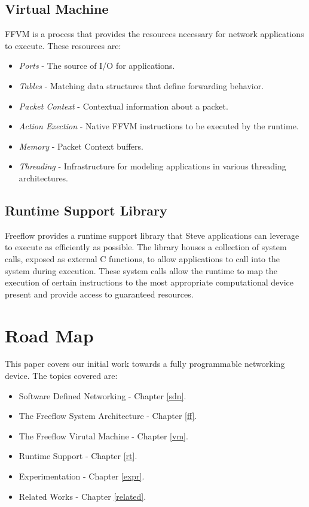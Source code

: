 \subsection{Virtual Machine}
FFVM is a process that provides the resources necessary for network
applications to execute. These resources are:

\begin{itemize}
\item \emph{Ports} - The source of I/O for applications.
\item \emph{Tables} - Matching data structures that define forwarding behavior.
\item \emph{Packet Context} - Contextual information about a packet.
\item \emph{Action Exection} - Native FFVM instructions to be executed by the
runtime.
\item \emph{Memory} - Packet Context buffers.
\item \emph{Threading} - Infrastructure for modeling applications in various
threading architectures.
\end{itemize}

\subsection{Runtime Support Library}
Freeflow provides a runtime support library that Steve applications can 
leverage to execute as efficiently as possible. The library houses a collection
of system calls, exposed as external C functions, to allow applications to call
into the system during execution. These system calls allow the runtime to map the execution of certain instructions to the most appropriate computational device present and provide access to guaranteed resources.

\section{Road Map}
This paper covers our initial work towards a fully programmable networking device. The topics covered are:
\begin{itemize}
\item Software Defined Networking - Chapter \ref{sdn}.
\item The Freeflow System Architecture - Chapter \ref{ff}.
\item The Freeflow Virutal Machine - Chapter \ref{vm}.
\item Runtime Support - Chapter \ref{rt}.
\item Experimentation - Chapter \ref{expr}.
\item Related Works - Chapter \ref{related}.
\end{itemize}